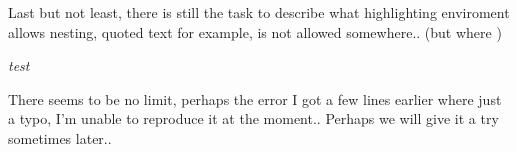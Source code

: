 \documentclass{generic}
\begin{document}
Last but not least, there is still the task to describe what highlighting enviroment allows
nesting, quoted text for example, is not allowed somewhere.. (but where )

\emph{ test  }

\emph{  }
\emph{  }


\emph{  }

There seems to be no limit, perhaps the error I got a few lines earlier where just a typo,
I'm unable to reproduce it at the moment.. Perhaps we will give it a try sometimes later..
\end{document}
